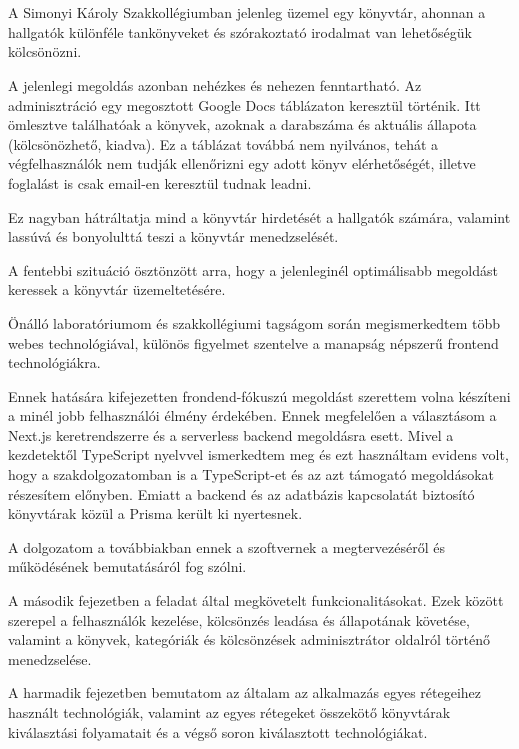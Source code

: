 \chapter{\bevezetes}

A Simonyi Károly Szakkollégiumban jelenleg üzemel egy könyvtár, ahonnan a hallgatók különféle tankönyveket és szórakoztató irodalmat van lehetőségük kölcsönözni.

A jelenlegi megoldás azonban nehézkes és nehezen fenntartható. Az adminisztráció egy megosztott Google Docs táblázaton keresztül történik. Itt ömlesztve találhatóak
a könyvek, azoknak a darabszáma és aktuális állapota (kölcsönözhető, kiadva). Ez a táblázat továbbá nem nyilvános, tehát a végfelhasználók nem tudják ellenőrizni egy
adott könyv elérhetőségét, illetve foglalást is csak email-en keresztül tudnak leadni.

Ez nagyban hátráltatja mind a könyvtár hirdetését a hallgatók számára, valamint lassúvá és bonyolulttá teszi a könyvtár menedzselését.

A fentebbi szituáció ösztönzött arra, hogy a jelenleginél optimálisabb megoldást keressek a könyvtár üzemeltetésére.

Önálló laboratóriumom és szakkollégiumi tagságom során megismerkedtem több webes technológiával, különös figyelmet szentelve a manapság népszerű
frontend technológiákra.

Ennek hatására kifejezetten frondend-fókuszú megoldást szerettem volna készíteni a minél jobb felhasználói élmény érdekében. Ennek megfelelően
a választásom a Next.js keretrendszerre és a serverless backend megoldásra esett. Mivel a kezdetektől TypeScript nyelvvel ismerkedtem meg és ezt használtam
evidens volt, hogy a szakdolgozatomban is a TypeScript-et és az azt támogató megoldásokat részesítem előnyben. Emiatt a backend és az adatbázis kapcsolatát
biztosító könyvtárak közül a Prisma került ki nyertesnek.

A dolgozatom a továbbiakban ennek a szoftvernek a megtervezéséről és működésének bemutatásáról fog szólni.

A második fejezetben a feladat által megkövetelt funkcionalitásokat. Ezek között szerepel a felhasználók kezelése, kölcsönzés leadása és
állapotának követése, valamint a könyvek, kategóriák és kölcsönzések adminisztrátor oldalról történő menedzselése.

A harmadik fejezetben bemutatom az általam az alkalmazás egyes rétegeihez használt technológiák, valamint az egyes rétegeket
összekötő könyvtárak kiválasztási folyamatait és a végső soron kiválasztott technológiákat.

